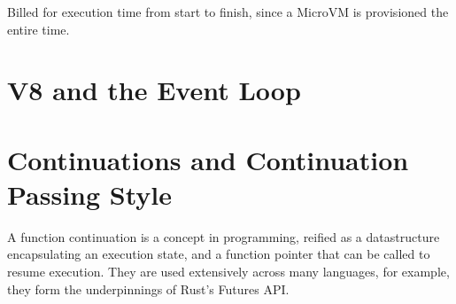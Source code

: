 Billed for execution time from start to finish, since a MicroVM is provisioned the entire time.

\section{V8 and the Event Loop}
\label{sec:js-event-loop}


\section{Continuations and Continuation Passing Style}
A function continuation is a concept in programming\cite{sussmanSCHEMEInterpreterExtended1975}, reified as a datastructure encapsulating an execution state, and a function pointer that can be called to resume execution. They are used extensively across many languages, for example, they form the underpinnings of Rust's Futures API.
